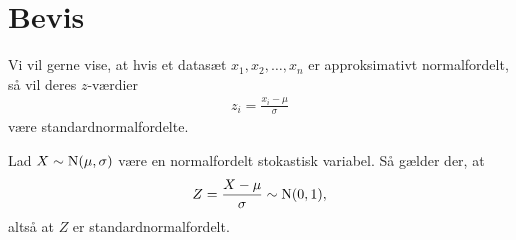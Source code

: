 
\section*{Bevis}

Vi vil gerne vise, at hvis et datasæt $x_1,x_2,\hdots,x_n$ er approksimativt normalfordelt, så vil deres $z$-værdier
\begin{align*}
	z_i = \frac{x_i-\mu}{\sigma}
\end{align*}
være standardnormalfordelte. 
\begin{setn}
	Lad $X\sim \textnormal{N}(\mu,\sigma)$ være en normalfordelt stokastisk variabel. Så gælder der, at
	\begin{align*}
		Z = \frac{X-\mu}{\sigma} \sim \textnormal{N}(0,1),
	\end{align*}
	altså at $Z$ er standardnormalfordelt.
\end{setn}
